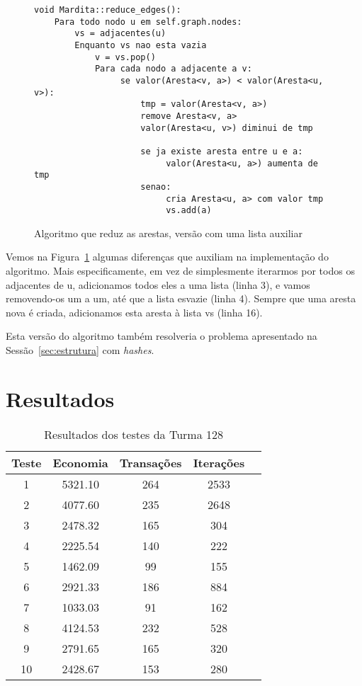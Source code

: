 \documentclass[12pt]{article}
\begin{document}
\begin{figure}[htb!]
  \centering
\begin{lstlisting}
void Mardita::reduce_edges():
    Para todo nodo u em self.graph.nodes:
        vs = adjacentes(u)
        Enquanto vs nao esta vazia
            v = vs.pop()
            Para cada nodo a adjacente a v:
                 se valor(Aresta<v, a>) < valor(Aresta<u, v>):
                     tmp = valor(Aresta<v, a>)
                     remove Aresta<v, a>
                     valor(Aresta<u, v>) diminui de tmp

                     se ja existe aresta entre u e a:
                          valor(Aresta<u, a>) aumenta de tmp
                     senao:
                          cria Aresta<u, a> com valor tmp
                          vs.add(a)
\end{lstlisting}
  \caption{Algoritmo que reduz as arestas, versão com uma lista auxiliar}
\label{fig:algoritmo:reduce_edges:push_pop}
\end{figure}

Vemos na Figura~\ref{fig:algoritmo:reduce_edges:push_pop} algumas diferenças que
auxiliam na implementação do algoritmo. Mais especificamente, em vez de
simplesmente iterarmos por todos os adjacentes de \textsf{u}, adicionamos todos
eles a uma lista (linha 3), e vamos removendo-os um a um, até que a lista
esvazie (linha 4). Sempre que uma aresta nova é criada, adicionamos esta aresta
à lista \textsf{vs} (linha 16).

Esta versão do algoritmo também resolveria o problema apresentado na
Sessão~\ref{sec:estrutura} com \textit{hashes}.

\section{Resultados}\label{sec:resultados}

\begin{table}[H]
  \centering
\begin{tabular}{||c|c||c|c|c||}
  \hline
Teste & Economia & Transações & Iterações \\ [0.5ex]
  \hline\hline
  1 & 5321.10 & 264 & 2533 \\
  \hline
  2 & 4077.60 & 235 & 2648 \\
  \hline
  3 & 2478.32 & 165 & 304 \\
  \hline
  4 & 2225.54 & 140 & 222 \\
  \hline
  5 & 1462.09  & 99 & 155 \\
  \hline
  6 & 2921.33 & 186 & 884 \\
  \hline
  7 & 1033.03  & 91 & 162 \\
  \hline
  8 & 4124.53 & 232 & 528 \\
  \hline
  9 & 2791.65 & 165 & 320 \\
  \hline
  10 & 2428.67 & 153 & 280 \\
\hline
\end{tabular}

\caption{Resultados dos testes da Turma 128}
\label{tab:resultados}
\end{table}
\end{document}
